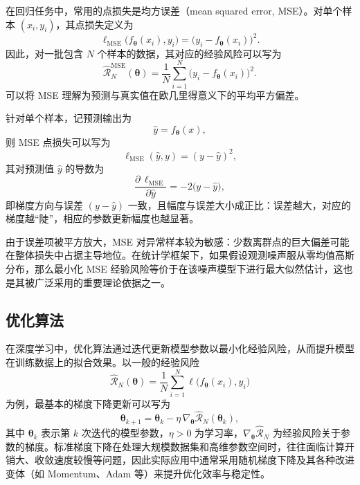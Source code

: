 在回归任务中，常用的点损失是均方误差（mean squared error, MSE）。对单个样本 $(x_i,y_i)$，其点损失定义为
\begin{equation}
    \ell_{\mathrm{MSE}}\bigl(f_{\bm{\theta}}(x_i), y_i\bigr)
    = \bigl( y_i - f_{\bm{\theta}}(x_i) \bigr)^2.
\end{equation}
因此，对一批包含 $N$ 个样本的数据，其对应的经验风险可以写为
\begin{equation}
    \hat{\mathcal{R}}_N^{\mathrm{MSE}}(\bm{\theta})
    = \frac{1}{N} \sum_{i=1}^{N}
    \bigl( y_i - f_{\bm{\theta}}(x_i) \bigr)^2.
\end{equation}
可以将 MSE 理解为预测与真实值在欧几里得意义下的平均平方偏差。

针对单个样本，记预测输出为
\begin{equation}
    \hat{y} = f_{\bm{\theta}}(x),
\end{equation}
则 MSE 点损失可以写为
\begin{equation}
    \ell_{\mathrm{MSE}}(\hat{y}, y) = (y - \hat{y})^2,
\end{equation}
其对预测值 $\hat{y}$ 的导数为
\begin{equation}
    \frac{\partial \,\ell_{\mathrm{MSE}}}{\partial \hat{y}}
    = -2 \bigl( y - \hat{y} \bigr),
\end{equation}
即梯度方向与误差 $(y - \hat{y})$ 一致，且幅度与误差大小成正比：误差越大，对应的梯度越“陡”，相应的参数更新幅度也越显著。

由于误差项被平方放大，MSE 对异常样本较为敏感：少数离群点的巨大偏差可能在整体损失中占据主导地位。在统计学框架下，如果假设观测噪声服从零均值高斯分布，那么最小化 MSE 经验风险等价于在该噪声模型下进行最大似然估计，这也是其被广泛采用的重要理论依据之一。

\subsection{优化算法}

在深度学习中，优化算法通过迭代更新模型参数以最小化经验风险，从而提升模型在训练数据上的拟合效果。以一般的经验风险
\begin{equation}
    \hat{\mathcal{R}}_N(\bm{\theta})
    = \frac{1}{N} \sum_{i=1}^{N}
    \ell\bigl(f_{\bm{\theta}}(x_i), y_i\bigr)
\end{equation}
为例，最基本的梯度下降更新可以写为
\begin{equation}
    \bm{\theta}_{k+1}
    = \bm{\theta}_{k}
    - \eta \,\nabla_{\bm{\theta}}
    \hat{\mathcal{R}}_N(\bm{\theta}_{k}),
\end{equation}
其中 $\bm{\theta}_{k}$ 表示第 $k$ 次迭代的模型参数，$\eta > 0$ 为学习率，$\nabla_{\bm{\theta}} \hat{\mathcal{R}}_N$ 为经验风险关于参数的梯度。标准梯度下降在处理大规模数据集和高维参数空间时，往往面临计算开销大、收敛速度较慢等问题，因此实际应用中通常采用随机梯度下降及其各种改进变体（如 Momentum、Adam 等）来提升优化效率与稳定性。

